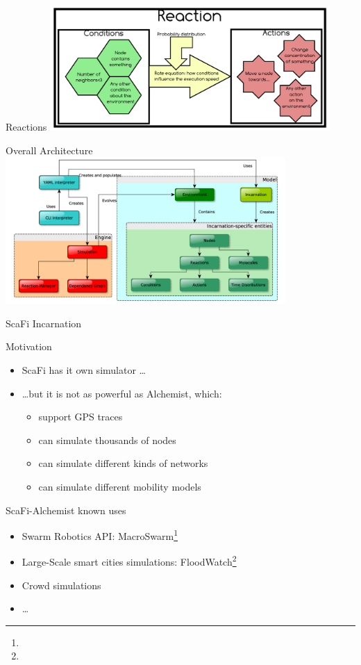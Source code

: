 \documentclass[presentation, 8pt]{beamer}\mode<presentation>{\usetheme{AMSBolognaFC}}
\begin{document}
\begin{frame}{Reactions}
\centering
\includegraphics[width=0.8\textwidth]{img/reaction-model.png}
\end{frame}
\begin{frame}{Overall Architecture}
\centering
\includegraphics[width=0.8\textwidth]{img/alchemist-architecture.png}
\end{frame}
\begin{frame}{ScaFi Incarnation}
\begin{block}{Motivation}
	\begin{itemize}
		\item ScaFi has it own simulator \dots
		\item \dots but it is not as powerful as Alchemist, which:
		\begin{itemize}
			\item support GPS traces
			\item can simulate thousands of nodes
			\item can simulate different kinds of networks
			\item can simulate different mobility models
		\end{itemize}
	\end{itemize}
\end{block}
\begin{exampleblock}{ScaFi-Alchemist known uses}
	\begin{itemize}
		\item Swarm Robotics API: MacroSwarm\footnote[frame]{}
		\item Large-Scale smart cities simulations: FloodWatch\footnote[frame]{}
		\item Crowd simulations
		\item \dots
	\end{itemize}
\end{exampleblock}
\end{frame}
\end{document}

